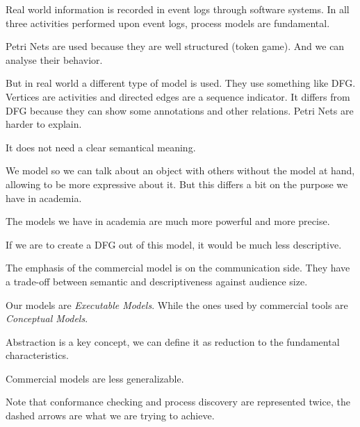 
\nextslides[slide=4]

Real world information is recorded in event logs through software systems. In all three activities performed upon event logs, process models are fundamental.

\nextslides

Petri Nets are used because they are well structured (token game). And we can analyse their behavior.

\nextslides

But in real world a different type of model is used. They use something like DFG. Vertices are activities and directed edges are a sequence indicator. It differs from DFG because they can show some annotations and other relations. Petri Nets are harder to explain.

\nextslides[slide=9]

It does not need a clear semantical meaning.

\nextslides[slide=15]

We model so we can talk about an object with others without the model at hand, allowing to be more expressive about it. But this differs a bit on the purpose we have in academia.

\nextslides

The models we have in academia are much more powerful and more precise.

If we are to create a DFG out of this model, it would be much less descriptive.

\nextslides

The emphasis of the commercial model is on the communication side. They have a trade-off between semantic and descriptiveness against audience size.

\nextslides

Our models are \emph{Executable Models}. While the ones used by commercial tools are \emph{Conceptual Models}.

\nextslides[until=22,highlight=22]

Abstraction is a key concept, we can define it as reduction to the fundamental characteristics.

\nextslides[until=24]

Commercial models are less generalizable.

\nextslides

Note that conformance checking and process discovery are represented twice, the dashed arrows are what we are trying to achieve.

